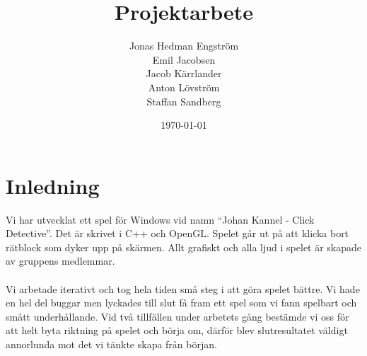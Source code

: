 \documentclass[a4paper]{article}
\title{Projektarbete}
\author{Jonas Hedman Engström\\Emil Jacobsen\\Jacob Kärrlander\\Anton Lövström\\Staffan Sandberg}
\date{\today}
\begin{document}
\ifpdf
{}
\else
{}
\fi

\maketitle



\pagestyle{fancyplain}
 
\fancyhf{}
 

\cfoot{\fancyplain{}{\thepage}}



\newpage
\tableofcontents

\newpage
\section{Inledning}
Vi har utvecklat ett spel för Windows vid namn “Johan Kannel - Click Detective”. Det är skrivet i C++ och OpenGL. Spelet går ut på att klicka bort rätblock som dyker upp på skärmen. Allt grafiskt och alla ljud i spelet är skapade av gruppens medlemmar.
\\
\\
Vi arbetade iterativt och tog hela tiden små steg i att göra spelet bättre. Vi hade en hel del buggar men lyckades till slut få fram ett spel som vi fann spelbart och smått underhållande. Vid två tillfällen under arbetets gång bestämde vi oss för att helt byta riktning på spelet och börja om, därför blev slutresultatet väldigt annorlunda mot det vi tänkte skapa från början.

\end{document}
